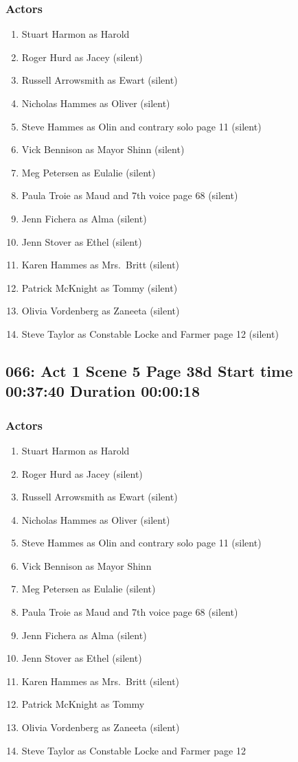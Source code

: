\subsubsection{Actors}
\begin{enumerate}
\item Stuart Harmon as Harold
\item Roger Hurd as Jacey (silent)
\item Russell Arrowsmith as Ewart (silent)
\item Nicholas Hammes as Oliver (silent)
\item Steve Hammes as Olin and contrary solo page 11 (silent)
\item Vick Bennison as Mayor Shinn (silent)
\item Meg Petersen as Eulalie (silent)
\item Paula Troie as Maud and 7th voice page 68 (silent)
\item Jenn Fichera as Alma (silent)
\item Jenn Stover as Ethel (silent)
\item Karen Hammes as Mrs.~Britt (silent)
\item Patrick McKnight as Tommy (silent)
\item Olivia Vordenberg as Zaneeta (silent)
\item Steve Taylor as Constable Locke and Farmer page 12 (silent)
\end{enumerate}


\subsection{066: Act 1 Scene 5 Page 38d Start time 00:37:40 Duration 00:00:18}

\subsubsection{Actors}
\begin{enumerate}
\item Stuart Harmon as Harold
\item Roger Hurd as Jacey (silent)
\item Russell Arrowsmith as Ewart (silent)
\item Nicholas Hammes as Oliver (silent)
\item Steve Hammes as Olin and contrary solo page 11 (silent)
\item Vick Bennison as Mayor Shinn
\item Meg Petersen as Eulalie (silent)
\item Paula Troie as Maud and 7th voice page 68 (silent)
\item Jenn Fichera as Alma (silent)
\item Jenn Stover as Ethel (silent)
\item Karen Hammes as Mrs.~Britt (silent)
\item Patrick McKnight as Tommy
\item Olivia Vordenberg as Zaneeta (silent)
\item Steve Taylor as Constable Locke and Farmer page 12
\end{enumerate}


